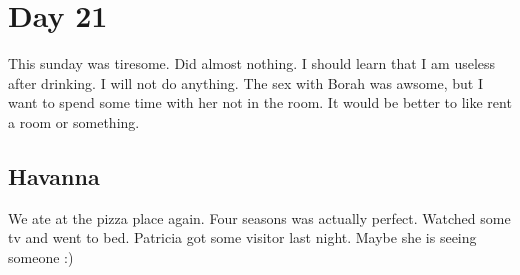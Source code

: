 \section{Day 21}
This sunday was tiresome.
Did almost nothing. I should learn that I am useless after drinking.
I will not do anything. The sex with Borah was awsome, but I want to spend some time with her not in the room.
It would be better to like rent a room or something.
\subsection{Havanna}
We ate at the pizza place again. Four seasons was actually perfect.
Watched some tv and went to bed. Patricia got some visitor last night.
Maybe she is seeing someone :)